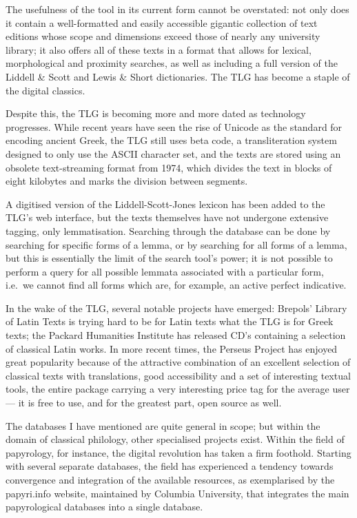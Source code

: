 The usefulness of the tool in its current form cannot be overstated: not only
does it contain a well-formatted and easily accessible gigantic collection of
text editions whose scope and dimensions exceed those of nearly any university
library; it also offers all of these texts in a format that allows for lexical,
morphological and proximity searches, as well as including a full version of
the Liddell \& Scott and Lewis \& Short dictionaries. The TLG has become a
staple of the digital classics.

Despite this, the TLG is becoming more and more dated as technology progresses.
While recent years have seen the rise of Unicode as the standard for encoding
ancient Greek, the TLG still uses beta code, a transliteration system designed
to only use the ASCII character set, and the texts are stored using an obsolete
text-streaming format from 1974, which divides the text in blocks of eight
kilobytes and marks the division between segments.

A digitised version of the Liddell-Scott-Jones lexicon has been added to the
TLG's web interface, but the texts themselves have not undergone extensive
tagging, only lemmatisation.  Searching through the database can be done by
searching for specific forms of a lemma, or by searching for all forms of a
lemma, but this is essentially the limit of the search tool's power; it is not
possible to perform a query for all possible lemmata associated with a
particular form, i.e.\ we cannot find all forms which are, for example, an
active perfect indicative.

In the wake of the TLG, several notable projects have emerged: Brepols' Library
of Latin Texts is trying hard to be for Latin texts what the TLG is for Greek
texts; the Packard Humanities Institute has released CD's containing a
selection of classical Latin works. In more recent times, the Perseus Project
has enjoyed great popularity because of the attractive combination of an
excellent selection of classical texts with translations, good accessibility
and a set of interesting textual tools, the entire package carrying a very
interesting price tag for the average user — it is free to use, and for the
greatest part, open source as well.

The databases I have mentioned are quite general in scope; but within the
domain of classical philology, other specialised projects exist. Within the
field of papyrology, for instance, the digital revolution has taken a firm
foothold. Starting with several separate databases, the field has experienced a
tendency towards convergence and integration of the available resources, as
exemplarised by the papyri.info website, maintained by Columbia University,
that integrates the main papyrological databases into a single database.

